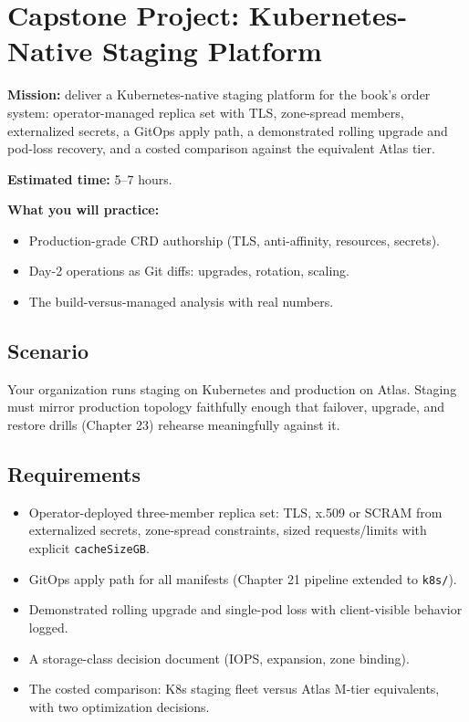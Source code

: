 \section{Capstone Project: Kubernetes-Native Staging Platform}\label{sec:ch22-capstone}

\begin{capstonebox}
\textbf{Mission:} deliver a Kubernetes-native staging platform for the book's order system: operator-managed replica set with TLS, zone-spread members, externalized secrets, a GitOps apply path, a demonstrated rolling upgrade and pod-loss recovery, and a costed comparison against the equivalent Atlas tier.

\textbf{Estimated time:} 5--7 hours.

\textbf{What you will practice:}
\begin{itemize}
    \item Production-grade CRD authorship (TLS, anti-affinity, resources, secrets).
    \item Day-2 operations as Git diffs: upgrades, rotation, scaling.
    \item The build-versus-managed analysis with real numbers.
\end{itemize}
\end{capstonebox}

\subsection*{Scenario}
Your organization runs staging on Kubernetes and production on Atlas. Staging must mirror production topology faithfully enough that failover, upgrade, and restore drills (Chapter 23) rehearse meaningfully against it.

\subsection*{Requirements}
\begin{itemize}
    \item Operator-deployed three-member replica set: TLS, x.509 or SCRAM from externalized secrets, zone-spread constraints, sized requests/limits with explicit \texttt{cacheSizeGB}.
    \item GitOps apply path for all manifests (Chapter 21 pipeline extended to \texttt{k8s/}).
    \item Demonstrated rolling upgrade and single-pod loss with client-visible behavior logged.
    \item A storage-class decision document (IOPS, expansion, zone binding).
    \item The costed comparison: K8s staging fleet versus Atlas M-tier equivalents, with two optimization decisions.
\end{itemize}

